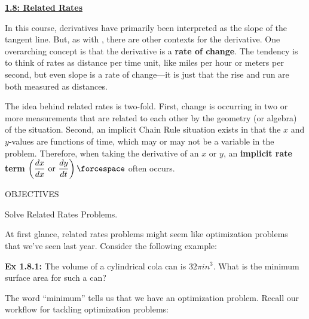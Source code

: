 \textbf{\underline{\large{1.8: Related Rates}}} \par

In this course, derivatives have primarily been interpreted as the slope of the tangent line. But, as with \href{https://www.merriam-webster.com/dictionary/rectilinear\%20motion}{\text{\textcolor{blue}{rectilinear motion}}}, there are other contexts for the derivative. One overarching concept is that the derivative is a \textbf{rate of change}. The tendency is to think of rates as distance per time unit, like miles per hour or meters per second, but even slope is a rate of change---it is just that the rise and run are both measured as distances. \par

The idea behind related rates is two-fold. First, change is occurring in two or more measurements that are related to each other by the geometry (or algebra) of the situation. Second, an implicit Chain Rule situation exists in that the $x$ and $y$-values are functions of time, which may or may not be a variable in the problem. Therefore, when taking the derivative of an $x$ or $y$, an \textbf{implicit rate term} $\left(\dfrac{dx}{dx} \text{ or } \dfrac{dy}{dt}\right) \forcespace$ often occurs. \par

\begin{tcolorbox}[objective]
    \begin{center}
        OBJECTIVES \\[11pt]
    \end{center}
    Solve Related Rates Problems.
\end{tcolorbox}

At first glance, related rates problems might seem like optimization problems that we've seen last year. Consider the following example:

\begin{tcolorbox}[example]
    \textbf{Ex 1.8.1: } The volume of a cylindrical cola can is $32\pi \si{in^3}$. What is the minimum surface area for such a can?
\end{tcolorbox}

The word ``minimum'' tells us that we have an optimization problem. Recall our workflow for tackling optimization problems:

